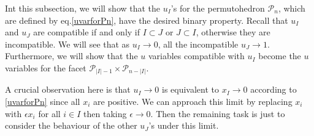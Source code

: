 \documentclass[hidelinks,12pt]{article}
\begin{document}
Int this subsection, we will show that the $u_{I}$'s for the permutohedron $\mathscr{P}_{n}$, which are defined by eq.\eqref{uvarforPn},
have the desired binary property. Recall that $u_{I}$ and $u_{J}$ are compatible if and only if $I \subset J$ or $J\subset I$, otherwise they are incompatible. We will see that as  $u_{I} \to 0$, all the incompatible $u_J \to 1$. Furthermore, we will show that the $u$ variables compatible with $u_{I}$ become the $u$ variables for the facet $\mathscr{P}_{\lvert I \rvert-1}\times \mathscr{P}_{n-\lvert I\rvert}$. 

A crucial observation here is that $u_{I}\to 0$ is equivalent to $x_{I}\to 0 $ according to \eqref{uvarforPn} since all $x_{i}$ are positive. We can approach this limit by replacing $x_{i}$ with $ \epsilon x_{i}$ for all $i\in I$ then taking $\epsilon \to 0$. Then the remaining task is just to consider the behaviour of the other $u_{J}$'s under this limit. 
\end{document}
